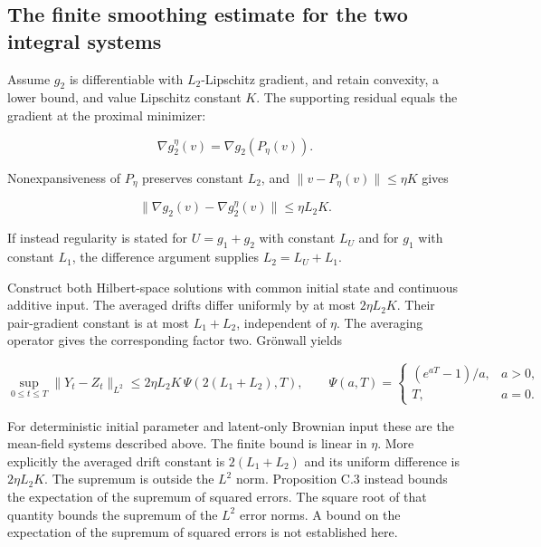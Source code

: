 \documentclass[11pt,a4paper]{report}
\begin{document}
\subsection{\texorpdfstring{The finite smoothing estimate for the two integral systems}{The finite smoothing estimate for the two integral systems}}
\label{report-step-ProximalLangevin-MeanFieldSmoothing-lean-5}


Assume \(g_2\) is differentiable with \(L_2\)-Lipschitz gradient, and retain convexity, a lower bound, and value Lipschitz constant \(K\). The supporting residual equals the gradient at the proximal minimizer:

\[
\nabla g_2^\eta(v)=\nabla g_2(P_\eta(v)).
\]

Nonexpansiveness of \(P_\eta\) preserves constant \(L_2\), and \(\|v-P_\eta(v)\|\le\eta K\) gives

\[
\|\nabla g_2(v)-\nabla g_2^\eta(v)\|\le\eta L_2K.
\]

If instead regularity is stated for \(U=g_1+g_2\) with constant \(L_U\) and for \(g_1\) with constant \(L_1\), the difference argument supplies \(L_2=L_U+L_1\).



Construct both Hilbert-space solutions with common initial state and continuous additive input. The averaged drifts differ uniformly by at most \(2\eta L_2K\). Their pair-gradient constant is at most \(L_1+L_2\), independent of \(\eta\). The averaging operator gives the corresponding factor two. Grönwall yields

\[
\sup_{0\le t\le T}\|Y_t-Z_t\|_{L^2}
 \le 2\eta L_2K\,\Psi(2(L_1+L_2),T),
\qquad
\Psi(a,T)=\begin{cases}(e^{aT}-1)/a,&a>0,\\T,&a=0.\end{cases}
\]

For deterministic initial parameter and latent-only Brownian input these are the mean-field systems described above. The finite bound is linear in \(\eta\). More explicitly the averaged drift constant is \(2(L_1+L_2)\) and its uniform difference is \(2\eta L_2K\). The supremum is outside the \(L^2\) norm. Proposition C.3 instead bounds the expectation of the supremum of squared errors. The square root of that quantity bounds the supremum of the \(L^2\) error norms. A bound on the expectation of the supremum of squared errors is not established here.
\end{document}
